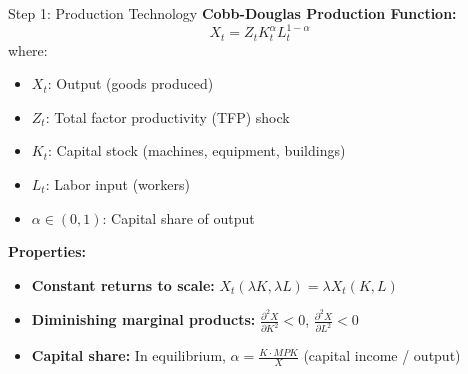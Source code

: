 \documentclass{beamer}
\begin{document}
\begin{frame}{Step 1: Production Technology}
    \textbf{Cobb-Douglas Production Function:}
    \begin{equation}\label{equ:production}
        X_t = Z_t K_t^\alpha L_t^{1-\alpha}
    \end{equation}
    where:
    \begin{itemize}
        \item $X_t$: Output (goods produced)
        \item $Z_t$: Total factor productivity (TFP) shock
        \item $K_t$: Capital stock (machines, equipment, buildings)
        \item $L_t$: Labor input (workers)
        \item $\alpha \in (0,1)$: Capital share of output
    \end{itemize}
    
    
    \textbf{Properties:}
    \begin{itemize}
        \item \textbf{Constant returns to scale:} $X_t(\lambda K, \lambda L) = \lambda X_t(K,L)$
        \item \textbf{Diminishing marginal products:} $\frac{\partial^2 X}{\partial K^2} < 0$, $\frac{\partial^2 X}{\partial L^2} < 0$
        \item \textbf{Capital share:} In equilibrium, $\alpha = \frac{K \cdot MPK}{X}$ (capital income / output)
    \end{itemize}
\end{frame}
\end{document}
